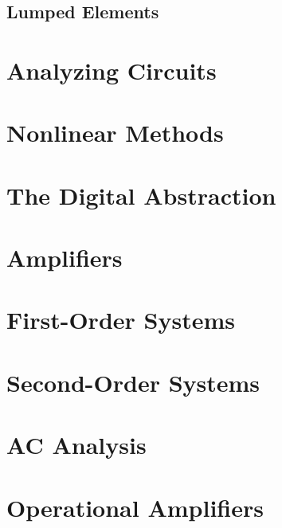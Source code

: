 \documentclass[
  letterpaper,
  DIV=11,
  numbers=noendperiod]{scrreprt}
\begin{document}
\hypertarget{lumped-elements}{%
\section{Lumped Elements}\label{lumped-elements}}

\hypertarget{analyzing-circuits}{%
\chapter{Analyzing Circuits}\label{analyzing-circuits}}

\hypertarget{nonlinear-methods}{%
\chapter{Nonlinear Methods}\label{nonlinear-methods}}

\hypertarget{the-digital-abstraction}{%
\chapter{The Digital Abstraction}\label{the-digital-abstraction}}

\hypertarget{amplifiers}{%
\chapter{Amplifiers}\label{amplifiers}}

\hypertarget{first-order-systems}{%
\chapter{First-Order Systems}\label{first-order-systems}}

\hypertarget{second-order-systems}{%
\chapter{Second-Order Systems}\label{second-order-systems}}

\hypertarget{ac-analysis}{%
\chapter{AC Analysis}\label{ac-analysis}}

\hypertarget{operational-amplifiers}{%
\chapter{Operational Amplifiers}\label{operational-amplifiers}}
\end{document}
